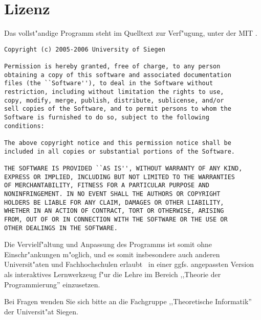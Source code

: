
\chapter{Lizenz}

Das vollst"andige Programm steht im Quelltext zur Verf"ugung, unter der MIT .
\begin{verbatim}
Copyright (c) 2005-2006 University of Siegen

Permission is hereby granted, free of charge, to any person
obtaining a copy of this software and associated documentation
files (the ``Software''), to deal in the Software without
restriction, including without limitation the rights to use,
copy, modify, merge, publish, distribute, sublicense, and/or
sell copies of the Software, and to permit persons to whom the
Software is furnished to do so, subject to the following
conditions:

The above copyright notice and this permission notice shall be
included in all copies or substantial portions of the Software.

THE SOFTWARE IS PROVIDED ``AS IS'', WITHOUT WARRANTY OF ANY KIND,
EXPRESS OR IMPLIED, INCLUDING BUT NOT LIMITED TO THE WARRANTIES
OF MERCHANTABILITY, FITNESS FOR A PARTICULAR PURPOSE AND
NONINFRINGEMENT. IN NO EVENT SHALL THE AUTHORS OR COPYRIGHT
HOLDERS BE LIABLE FOR ANY CLAIM, DAMAGES OR OTHER LIABILITY,
WHETHER IN AN ACTION OF CONTRACT, TORT OR OTHERWISE, ARISING
FROM, OUT OF OR IN CONNECTION WITH THE SOFTWARE OR THE USE OR
OTHER DEALINGS IN THE SOFTWARE.
\end{verbatim}
Die Vervielf"altung und Anpassung des Programms ist somit ohne Einschr"ankungen m"oglich, und es somit insbesondere
auch anderen Universit"aten und Fachhochschulen erlaubt \TPML\ in einer ggfs. angepassten Version als interaktives
Lernwerkzeug f"ur die Lehre im Bereich ,,Theorie der Programmierung'' einzusetzen.

Bei Fragen wenden Sie sich bitte an die Fachgruppe ,,Theoretische Informatik'' der Universit"at Siegen.



